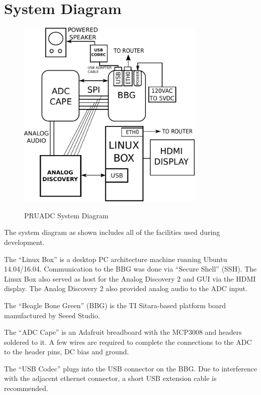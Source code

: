 %
%
%

\chapter{System Diagram}


\begin{figure}[h]
\centering
\includegraphics[width=0.8\textwidth]{diagrams/system_ink}
\centering\bfseries
\caption{PRUADC System Diagram}
\end{figure}

The system diagram as shown includes all of the facilities used during development.

The ``Linux Box'' is a desktop PC architecture machine running Ubuntu 14.04/16.04.  Communication to the BBG was done via ``Secure Shell'' (SSH).  The Linux Box also served as host for the Analog Discovery 2 and GUI via the HDMI display.  The Analog Discovery 2 also provided analog audio to the ADC input.

The ``Beagle Bone Green'' (BBG) is the TI Sitara-based platform board manufactured by Seeed Studio.

The ``ADC Cape'' is an Adafruit breadboard with the MCP3008 and headers soldered to it.  A few wires are required to complete the connections to the ADC to the header pins, DC bias and ground.

The ``USB Codec'' plugs into the USB connector on the BBG.  Due to interference with the adjacent ethernet connector, a short USB extension cable is recommended.




